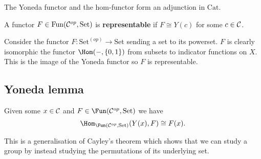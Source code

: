 \documentclass[../Year2.tex]{subfiles}
\begin{document}
\begin{lemma}
    The Yoneda functor and the hom-functor form an adjunction in $\text{Cat}$.
\end{lemma}

\begin{definition}[Representable]
    A functor $F\in\text{Fun}(\mathcal{C}^{op},\text{Set})$ is \textbf{representable} if $F\cong Y(c)$ for some $c\in\mathcal{C}$.
\end{definition}

\begin{example}
    Consider the functor $F:\text{Set}^{(op)}\rightarrow \text{Set}$ sending a set to its powerset. $F$ is clearly isomorphic the functor $\Hom(-,\{0,1\})$ from subsets to indicator functions on $X$. This is the image of the Yoneda functor so $F$ is representable.
\end{example}

\subsection{Yoneda lemma}

\begin{theorem}
    Given some $x\in\mathcal{C}$ and $F\in\Fun(\CCC^{op},\text{Set})$ we have \[
        \Hom_{\Fun(\CCC^{op},\text{Set})}(Y(x),F)\cong F(x)
        \black{.}\]
\end{theorem}

\vspace{-25pt}

\begin{remark}
    This is a generalisation of Cayley's theorem which shows that we can study a group by instead studying the permutations of its underlying set.
\end{remark}
\end{document}
